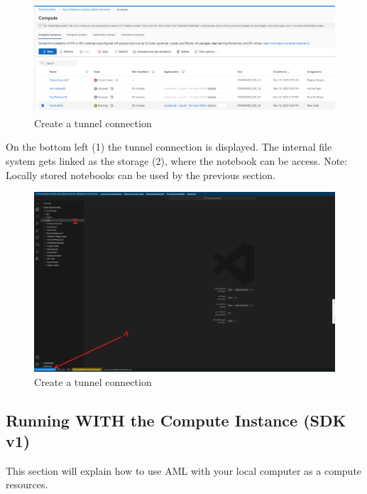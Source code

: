 \begin{figure}[H]
	\centering
	\includegraphics[scale = 0.3]{attachment/chapter_AML/Scc022}
	\caption{Create a tunnel connection}
\end{figure}

On the bottom left (1) the tunnel connection is displayed. The internal file system gets linked as the storage (2), where the notebook can be access. Note: Locally stored notebooks can be used by the previous section.

\begin{figure}[H]
	\centering
	\includegraphics[scale = 0.3]{attachment/chapter_AML/Scc021}
	\caption{Create a tunnel connection}
\end{figure}


\subsection{Running WITH the Compute Instance (SDK v1)}

This section will explain how to use \gls{AML} with your local computer as a compute resources.

